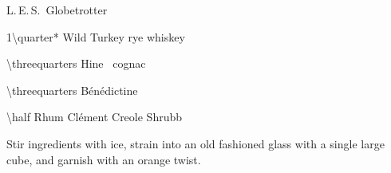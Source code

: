 \begin{PDTCocktail}{L.\,E.\,S.\ Globetrotter}
	\begin{Ingredients}
	\item \SI{1\quarter*}{\oz} Wild Turkey rye whiskey
	\item \SI{\threequarters}{\oz} Hine \vsop\ cognac
	\item \SI{\threequarters}{\oz} B\'en\'edictine
	\item \SI{\half}{\oz} Rhum Cl\'ement Creole Shrubb
	\end{Ingredients}
	
	\begin{Instructions}
	Stir ingredients with ice, strain into an old fashioned glass with a single large cube, and garnish with an orange twist.
	\end{Instructions}
\end{PDTCocktail}